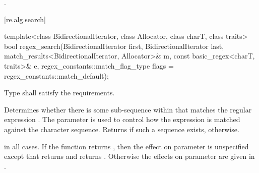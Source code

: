 \begin{itemdescr}
\pnum
\returns {}.
\end{itemdescr}

[re.alg.search]{}

%
\begin{itemdecl}
template<class BidirectionalIterator, class Allocator, class charT, class traits>
  bool regex_search(BidirectionalIterator first, BidirectionalIterator last,
                    match_results<BidirectionalIterator, Allocator>& m,
                    const basic_regex<charT, traits>& e,
                    regex_constants::match_flag_type flags = regex_constants::match_default);
\end{itemdecl}

\begin{itemdescr}
\pnum
\requires
Type  shall satisfy the
 requirements.

\pnum
\effects Determines whether there is some sub-sequence within  that matches
the regular expression . The parameter  is used to control how the
expression is matched against the character sequence. Returns  if such a sequence
exists,  otherwise.

\pnum
\ensures
{} in all cases.
If the function returns , then the effect
on parameter  is unspecified except that 
returns  and  returns .  Otherwise
the effects on parameter  are given in .
\end{itemdescr}

